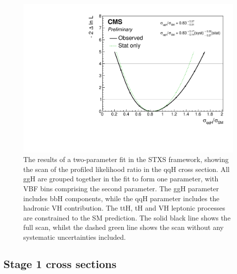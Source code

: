 \begin{figure}[hptb]
  \centering
  \includegraphics[width=\textwidth]{Figures/Results/ObsStage0_r_qqH.pdf}
  \caption[Likelihood scan for the qqH parameter in a two-parameter fit.]
  {
    The results of a two-parameter fit in the STXS framework,
    showing the scan of the profiled likelihood ratio in the qqH cross section.
    All ggH are grouped together in the fit to form one parameter, 
    with VBF bins comprising the second parameter.
    The ggH parameter includes bbH components, 
    while the qqH parameter includes the hadronic VH contribution. 
    The ttH, tH and VH leptonic processes are constrained to the SM prediction. 
    The solid black line shows the full scan, 
    whilst the dashed green line shows the scan without any systematic uncertainties included.
  }
  \label{fig:results_Stage0_qqH}
\end{figure}

\subsection{Stage 1 cross sections}

